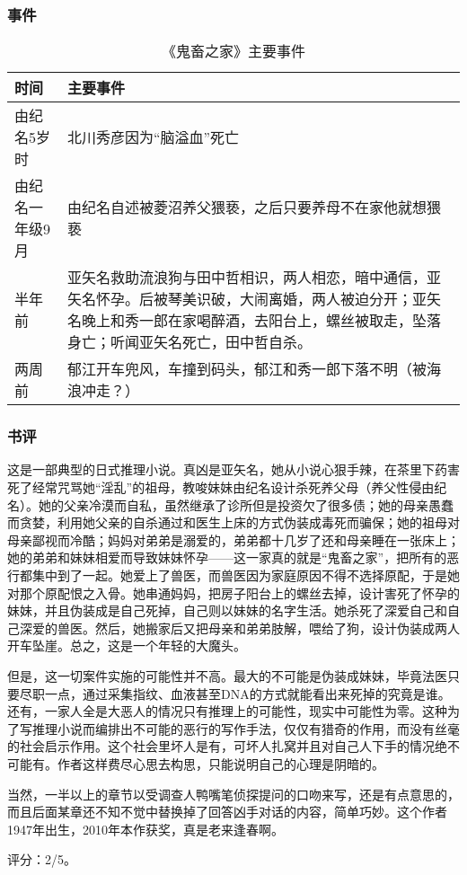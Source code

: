 \subsubsection{事件}

\begin{longtable}{p{} | p{}}
    \caption{《鬼畜之家》主要事件} \\
    \hline
    时间 & 主要事件 \\
    \hline
    \endhead

    \hline
    \endfoot

由纪名5岁时 & 北川秀彦因为“脑溢血”死亡 \\
由纪名一年级9月 & 由纪名自述被菱沼养父猥亵，之后只要养母不在家他就想猥亵 \\
半年前 & 亚矢名救助流浪狗与田中哲相识，两人相恋，暗中通信，亚矢名怀孕。后被琴美识破，大闹离婚，两人被迫分开；亚矢名晚上和秀一郎在家喝醉酒，去阳台上，螺丝被取走，坠落身亡；听闻亚矢名死亡，田中哲自杀。 \\
两周前 & 郁江开车兜风，车撞到码头，郁江和秀一郎下落不明（被海浪冲走？） \\

\end{longtable}
\subsubsection{书评}
这是一部典型的日式推理小说。真凶是亚矢名，她从小说心狠手辣，在茶里下药害死了经常咒骂她“淫乱”的祖母，教唆妹妹由纪名设计杀死养父母（养父性侵由纪名）。她的父亲冷漠而自私，虽然继承了诊所但是投资欠了很多债；她的母亲愚蠢而贪婪，利用她父亲的自杀通过和医生上床的方式伪装成毒死而骗保；她的祖母对母亲鄙视而冷酷；妈妈对弟弟是溺爱的，弟弟都十几岁了还和母亲睡在一张床上；她的弟弟和妹妹相爱而导致妹妹怀孕——这一家真的就是“鬼畜之家”，把所有的恶行都集中到了一起。她爱上了兽医，而兽医因为家庭原因不得不选择原配，于是她对那个原配恨之入骨。她串通妈妈，把房子阳台上的螺丝去掉，设计害死了怀孕的妹妹，并且伪装成是自己死掉，自己则以妹妹的名字生活。她杀死了深爱自己和自己深爱的兽医。然后，她搬家后又把母亲和弟弟肢解，喂给了狗，设计伪装成两人开车坠崖。总之，这是一个年轻的大魔头。

但是，这一切案件实施的可能性并不高。最大的不可能是伪装成妹妹，毕竟法医只要尽职一点，通过采集指纹、血液甚至DNA的方式就能看出来死掉的究竟是谁。还有，一家人全是大恶人的情况只有推理上的可能性，现实中可能性为零。这种为了写推理小说而编排出不可能的恶行的写作手法，仅仅有猎奇的作用，而没有丝毫的社会启示作用。这个社会里坏人是有，可坏人扎窝并且对自己人下手的情况绝不可能有。作者这样费尽心思去构思，只能说明自己的心理是阴暗的。

当然，一半以上的章节以受调查人鸭嘴笔侦探提问的口吻来写，还是有点意思的，而且后面某章还不知不觉中替换掉了回答凶手对话的内容，简单巧妙。这个作者1947年出生，2010年本作获奖，真是老来逢春啊。

评分：2/5。